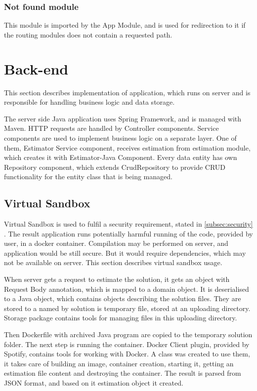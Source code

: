             \subsubsection{Not found module}
            This module is imported by the App Module, and is used for redirection to it if the routing modules does not contain a requested path.
    
    
    \section{Back-end}
    This section describes implementation of application, which runs on server and is responsible for handling business logic and data storage.
    
    The server side Java application uses Spring Framework, and is managed with Maven. HTTP requests are handled by Controller components. Service components are used to implement business logic on a separate layer. One of them, Estimator Service component, receives estimation from estimation module, which creates it with Estimator-Java Component. Every data entity has own Repository component, which extends CrudRepository to provide CRUD functionality for the entity class that is being managed.
    
        \subsection{Virtual Sandbox}
        Virtual Sandbox is used to fulfil a security requirement, stated in \ref{subsec:security} . The result application runs potentially harmful running of the code, provided by user, in a docker container. Compilation may be performed on server, and application would be still secure. But it would require dependencies, which may not be available on server. This section describes virtual sandbox usage.
        
        When server gets a request to estimate the solution, it gets an object with Request Body annotation, which is mapped to a domain object. It is deserialised to a Java object, which contains objects describing the solution files. They are stored to a named by solution is temporary file, stored at an uploading directory. Storage package contains tools for managing files in this uploading directory.
        
        Then Dockerfile with archived Java program are copied to the temporary solution folder. The next step is running the container. Docker Client plugin, provided by Spotify, contains tools for working with Docker. A class was created to use them, it takes care of building an image, container creation, starting it, getting an estimation file content and destroying the container. The result is parsed from JSON format, and based on it estimation object it created.
        
